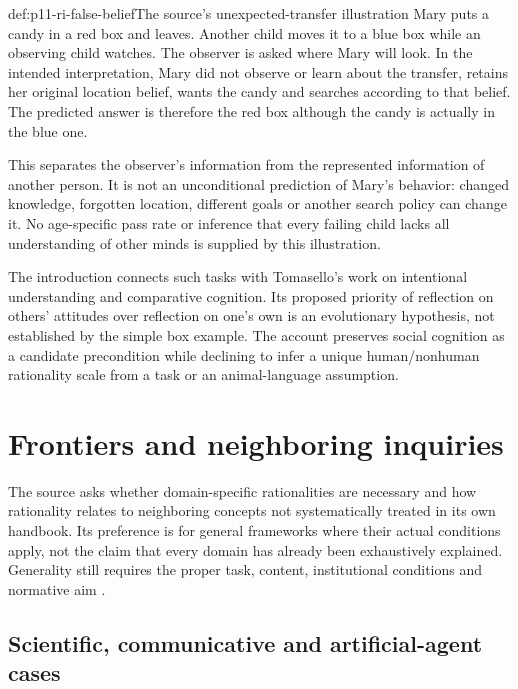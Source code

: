 \begin{hbexample}{def:p11-ri-false-belief}{The source's unexpected-transfer illustration}
Mary puts a candy in a red box and leaves. Another child moves it to
a blue box while an observing child watches. The observer is asked
where Mary will look. In the intended interpretation, Mary did not
observe or learn about the transfer, retains her original location
belief, wants the candy and searches according to that belief.
The predicted answer is therefore the red box although the candy is
actually in the blue one.

This separates the observer's information from the represented
information of another person. It is not an unconditional prediction
of Mary's behavior: changed knowledge, forgotten location, different
goals or another search policy can change it. No age-specific pass
rate or inference that every failing child lacks all understanding of
other minds is supplied by this illustration.
\cite[p.~43]{KnauffSpohn2021FrameworksIntro}
\end{hbexample}

The introduction connects such tasks with Tomasello's work on
intentional understanding and comparative cognition. Its proposed
priority of reflection on others' attitudes over reflection on one's
own is an evolutionary hypothesis, not established by the simple
box example. The account preserves social cognition as a candidate
precondition while declining to infer a unique human/nonhuman
rationality scale from a task or an animal-language assumption.

\section{Frontiers and neighboring inquiries}
\label{sec:p11-ri-frontiers}

The source asks whether domain-specific rationalities are necessary
and how rationality relates to neighboring concepts not systematically
treated in its own handbook. Its preference is for general frameworks
where their actual conditions apply, not the claim that every domain
has already been exhaustively explained. Generality still requires
the proper task, content, institutional conditions and normative aim
\cite[pp.~44--50]{KnauffSpohn2021FrameworksIntro}.

\subsection{Scientific, communicative and artificial-agent cases}

